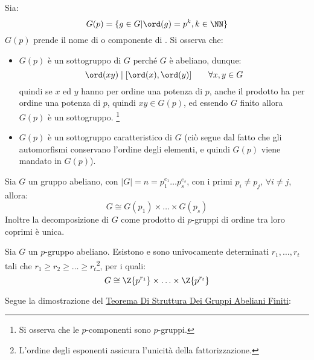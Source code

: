 \documentclass[11pt]{scrartcl}
\begin{document}
\begin{remark}
    Sia:
        \[ G(p) = \{g \in G | \ord(g) = p^k, k \in \NN\}
            \]
    $G(p)$ prende il nome di  o componente di .
    Si osserva che:
        \begin{itemize}
            \item $G(p)$ è un sottogruppo di $G$ perché $G$ è abeliano, dunque:
                \[ \ord(xy) \mid [\ord(x),\ord(y)] \qquad \forall x,y \in G
                    \]
                quindi se $x$ ed $y$ hanno per ordine una potenza di $p$, anche il prodotto ha per ordine una potenza di $p$, quindi $xy \in G(p)$, ed essendo 
                $G$ finito allora $G(p)$ è un sottogruppo. \footnote{Si osserva che le $p$-componenti sono $p$-gruppi.}
            \item $G(p)$ è un sottogruppo caratteristico di $G$ (ciò segue dal fatto che gli automorfismi conservano l'ordine degli elementi, e quindi $G(p)$ viene mandato in $G(p)$).
        \end{itemize}
\end{remark}

\begin{theorem}
    \label{t:t1}
    Sia $G$ un gruppo abeliano, con $|G| = n = p_1^{e_1}\ldots p_s^{e_s}$, con i primi $p_i \ne p_j$, $\forall i \ne j$, allora:
        \[ G \cong G(p_1) \times \ldots \times G(p_s)
            \]
    Inoltre la decomposizione di $G$ come prodotto di $p$-gruppi di ordine tra loro coprimi è unica.
\end{theorem}

\begin{theorem}
    \label{t:t2}
    Sia $G$ un $p$-gruppo abeliano. Esistono e sono univocamente determinati $r_1,\ldots,r_t$ tali che $r_1 \geq r_2 \geq \ldots \geq r_t$\footnote{L'ordine
     degli esponenti assicura l'unicità della fattorizzazione.}, per i quali:
        \[ G \cong \Z{p^{r_1}} \times \ldots \times \Z{p^{r_t}}
            \]
\end{theorem}

\pagebreak

Segue la dimostrazione del \hyperref[t:struttura]{Teorema Di Struttura Dei Gruppi Abeliani Finiti}:
\end{document}

